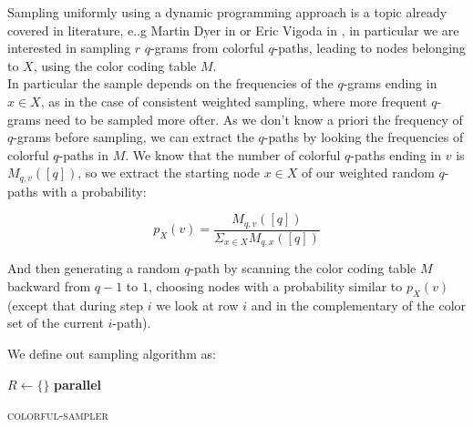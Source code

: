 Sampling uniformly using a dynamic programming approach is a topic already covered in literature, e..g Martin Dyer in \cite{Dyer:2003:ACD:780542.780643} or Eric Vigoda in \cite{Vigoda2010LectureNO},
in particular we are interested in sampling $r$ $q$-grams from colorful $q$-paths, leading to nodes belonging to $X$, using the color coding table $M$.\\

In particular the sample depends on the frequencies of the $q$-grams ending in $x \in X$,
as in the case of consistent weighted sampling, where more frequent $q$-grams need to be sampled more ofter.
As we don't know a priori the frequency of $q$-grams before sampling, 
we can extract the $q$-paths by looking the frequencies of colorful $q$-paths in $M$. 
We know that the number of colorful $q$-paths ending in $v$ is $M_{q,v}([q])$, 
so we extract the starting node $x \in X$ of our weighted random $q$-paths with a probability:

\begin{equation}
	p_{X}(v) = \frac{ M_{q,v}([q]) }{ \Sigma_{x \in X}{M_{q, x}([q])} }
\end{equation}

And then generating a random $q$-path by scanning the color coding table $M$ 
backward from $q-1$ to $1$, choosing nodes with a probability similar to $p_{X}(v)$
(except that during step $i$ we look at row $i$ and in the complementary of the color set of the current $i$-path).

We define out sampling algorithm as: \clearpage

\begin{algorithm}[h]
	\small
	\DontPrintSemicolon
	\BlankLine
	$R \gets \{\}$\;
	\BlankLine
	\textbf{parallel} 
	\BlankLine
	\BlankLine
	\caption{\textsc{colorful-sampler}}
	\label{alg:randomsample}
	\label{alg:sample}
\end{algorithm}

